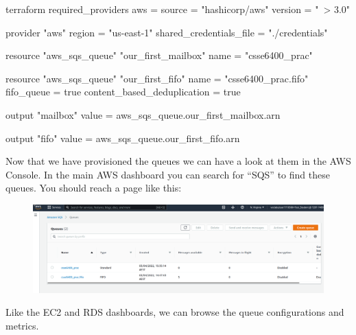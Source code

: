 \documentclass{csse4400}
\begin{document}


\begin{code}[language=terraform, numbers=none]{}
terraform {
  required_providers {
    aws = {
      source = "hashicorp/aws"
      version = "~> 3.0"
    }
  }
}

provider "aws" {
  region = "us-east-1"
  shared_credentials_file = "./credentials"
}

resource "aws_sqs_queue" "our_first_mailbox" {
  name                        = "csse6400_prac"
}

resource "aws_sqs_queue" "our_first_fifo" {
  name                        = "csse6400_prac.fifo"
  fifo_queue                  = true
  content_based_deduplication = true
}

output "mailbox" {
  value = aws_sqs_queue.our_first_mailbox.arn
}

output "fifo" {
  value = aws_sqs_queue.our_first_fifo.arn
}
\end{code}

Now that we have provisioned the queues we can have a look at them in the AWS Console.
In the main AWS dashboard you can search for ``SQS'' to find these queues.
You should reach a page like this:

\begin{figure}[H]
  \includegraphics[width=\textwidth]{images/sqspanel}
\end{figure}

Like the EC2 and RDS dashboards,
we can browse the queue configurations and metrics.
  
\end{document}

